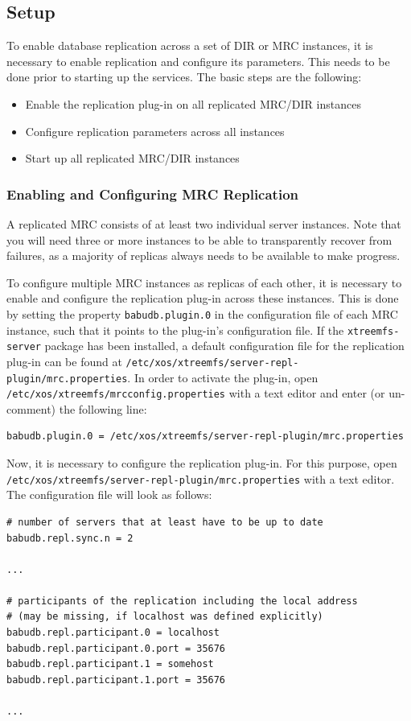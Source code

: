 \documentclass[a4paper,10pt]{book}
\begin{document}
\subsection{Setup}
To enable database replication across a set of DIR or MRC instances, it is necessary to enable replication and configure its parameters. This needs to be done prior to starting up the services. The basic steps are the following:

\begin{itemize}
 \item Enable the replication plug-in on all replicated MRC/DIR instances
 \item Configure replication parameters across all instances
 \item Start up all replicated MRC/DIR instances
\end{itemize}

\subsubsection{Enabling and Configuring MRC Replication}
A replicated MRC consists of at least two individual server instances. Note that you will need three or more instances to be able to transparently recover from failures, as a majority of replicas always needs to be available to make progress.

To configure multiple MRC instances as replicas of each other, it is necessary to enable and configure the replication plug-in across these instances. This is done by setting the property \texttt{babudb.plugin.0} in the configuration file of each MRC instance, such that it points to the plug-in's configuration file. If the \texttt{xtreemfs-server} package has been installed, a default configuration file for the replication plug-in can be found at \texttt{/etc/xos/xtreemfs/server-repl-plugin/mrc.properties}. In order to activate the plug-in, open \texttt{/etc/xos/xtreemfs/mrcconfig.properties} with a text editor and enter (or un-comment) the following line:

\begin{verbatim}
babudb.plugin.0 = /etc/xos/xtreemfs/server-repl-plugin/mrc.properties
\end{verbatim}

Now, it is necessary to configure the replication plug-in. For this purpose, open \texttt{/etc/xos/xtreemfs/server-repl-plugin/mrc.properties} with a text editor. The configuration file will look as follows:

\begin{verbatim}
# number of servers that at least have to be up to date
babudb.repl.sync.n = 2

...

# participants of the replication including the local address
# (may be missing, if localhost was defined explicitly)
babudb.repl.participant.0 = localhost
babudb.repl.participant.0.port = 35676
babudb.repl.participant.1 = somehost
babudb.repl.participant.1.port = 35676

...
\end{verbatim}
\end{document}
